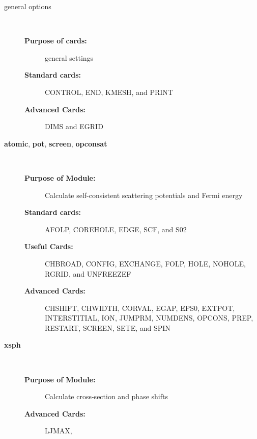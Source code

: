 \documentclass[11pt,oneside]{report} %
\renewcommand{\htmlref}[2]{\hyperlink{#2}{#1}}
\newcommand{\module}[1]{\textrm{\bf{#1}}}
\renewcommand{\htmlref}[2]{{#1}} %
\begin{document}
\begin{description}
\begin{description}
\item[{\large general options}]\dotfill\  
  \begin{description}
  \item[\textbf{Purpose of cards:}] general settings
  \item[\textbf{Standard cards:}] 
    \htmlref{CONTROL}{card:con},
    \htmlref{END}{card:end}, 
    \htmlref{KMESH}{card:kme}, 
    and \htmlref{PRINT}{card:pri}
    \item[\textbf{Advanced Cards:}] 
    \htmlref{DIMS}{card:dim} and
    \htmlref{EGRID}{card:egr}
\end{description}
\item[\large\module{atomic}, \module{pot}, \module{screen}, \module{opconsat}]\dotfill\  
  \begin{description}
  \item[\textbf{Purpose of Module:}] Calculate self-consistent
    scattering potentials and Fermi energy
  \item[\textbf{Standard cards:}] 
    \htmlref{AFOLP}{card:afo}, 
    \htmlref{COREHOLE}{card:chl},
    \htmlref{EDGE}{card:edg},
    \htmlref{SCF}{card:scf}, 
    and \htmlref{S02}{card:s02}
  \item[\textbf{Useful Cards:}] 
    \htmlref{CHBROAD}{card:chb},
    \htmlref{CONFIG}{card:cfg},
    \htmlref{EXCHANGE}{card:exc},
    \htmlref{FOLP}{card:fol},
    \htmlref{HOLE}{card:hol},    
    \htmlref{NOHOLE}{card:noh}, 
    \htmlref{RGRID}{card:rgr},
    and \htmlref{UNFREEZEF}{card:unf}
  \item[\textbf{Advanced Cards:}] 
    \htmlref{CHSHIFT}{card:csh},
    \htmlref{CHWIDTH}{card:chw},
    \htmlref{CORVAL}{card:crv},
    \htmlref{EGAP}{card:ega},
    \htmlref{EPS0}{card:eps},
    \htmlref{EXTPOT}{card:ext}, 
    \htmlref{INTERSTITIAL}{card:int}, 
    \htmlref{ION}{card:ion},
    \htmlref{JUMPRM}{card:jum},
    \htmlref{NUMDENS}{card:num},
    \htmlref{OPCONS}{card:opc},
    \htmlref{PREP}{card:pre},
    \htmlref{RESTART}{card:res},
    \htmlref{SCREEN}{card:scr},
    \htmlref{SETE}{card:set},
    and \htmlref{SPIN}{card:spi} 
  \end{description}
\item[{\large\module{xsph}}]\dotfill\  
  \begin{description}
  \item[\textbf{Purpose of Module:}] Calculate cross-section and phase shifts
  \item[\textbf{Advanced Cards:}] 
    \htmlref{LJMAX}{card:ljm},

\end{description}
\end{description}
\end{description}
\end{document}
